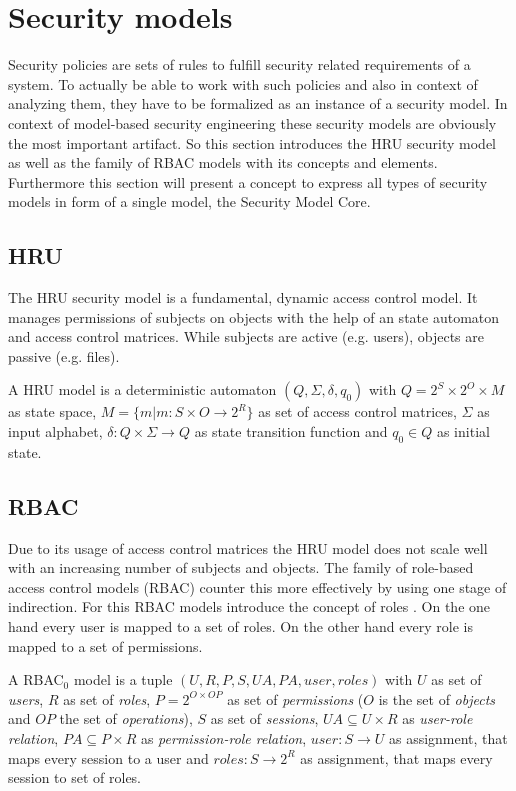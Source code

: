 \documentclass[twoside, openright, 12pt]{book}
\begin{document}
\section{Security models}
\label{security_models}
Security policies are sets of rules to fulfill security related requirements of a system.
To actually be able to work with such policies and also in context of analyzing them, they have to be formalized as an instance of a security model.
In context of model-based security engineering these security models are obviously the most important artifact.
So this section introduces the HRU security model as well as the family of RBAC models with its concepts and elements.
Furthermore this section will present a concept to express all types of security models in form of a single model, the Security Model Core.

\subsection{HRU}
\label{HRU}
The HRU security model \citep*{Harrison75a} is a fundamental, dynamic access control model.
It manages permissions of subjects on objects with the help of an state automaton and access control matrices.
While subjects are active (e.g. users), objects are passive (e.g. files).

\begin{xdefinition}[HRU] 
A HRU model is a deterministic automaton
$(Q, \Sigma , \delta , q_{0})$ with 
$Q = 2^S \times 2^O \times M$ as state space, 
$M = \lbrace m|m:S \times O \rightarrow 2^R \rbrace$ as set of access control matrices, 
$\Sigma$ as input alphabet, 
$\delta : Q \times \Sigma \rightarrow Q$ as state transition function and 
$q_0 \in Q$ as initial state.
\end{xdefinition}



\subsection{RBAC}
\label{RBAC}
Due to its usage of access control matrices the HRU model does not scale well with an increasing number of subjects and objects.
The family of role-based access control models (RBAC) counter this more effectively by using one stage of indirection.
For this RBAC models introduce the concept of roles \citep{Sandhu96}.
On the one hand every user is mapped to a set of roles.
On the other hand every role is mapped to a set of permissions.

\begin{xdefinition}[RBAC] 
A RBAC$_0$ model is a tuple $(U, R, P, S, UA, PA, user, roles)$ with 
$U$ as set of \textit{users}, 
$R$ as set of \textit{roles}, 
$P = 2^{O \times OP}$ as set of \textit{permissions} 
($O$ is the set of \textit{objects} and 
$OP$ the set of \textit{operations}), 
$S$ as set of \textit{sessions}, 
$UA \subseteq U \times R$ as \textit{user-role relation}, 
$PA \subseteq P \times R$ as \textit{permission-role relation}, 
$user: S \rightarrow U$ as assignment, that maps every session to a user and
$roles: S \rightarrow 2^R$ as assignment, that maps every session to set of roles.
\end{xdefinition}
\end{document}
